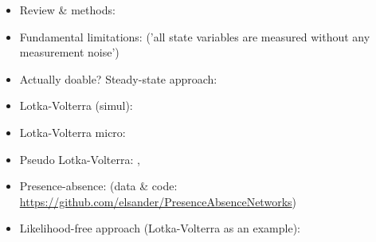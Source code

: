 
\begin{itemize}
 \item Review \& methods: \cite{FLG15}
 \item Fundamental limitations: \cite{AML17} ('all state variables are measured without any measurement noise')
 \item Actually doable? Steady-state approach: \cite{XAF17}
 \item Lotka-Volterra (simul): \cite{BeW14}
 \item Lotka-Volterra micro: \cite{SBT13}
 \item Pseudo Lotka-Volterra: \cite{AHL12}, \cite{FaR12}
 \item Presence-absence: \cite{SWA17} (data \& code: \url{https://github.com/elsander/PresenceAbsenceNetworks})
 \item Likelihood-free approach (Lotka-Volterra as an example): \cite{TRB17}
\end{itemize}

